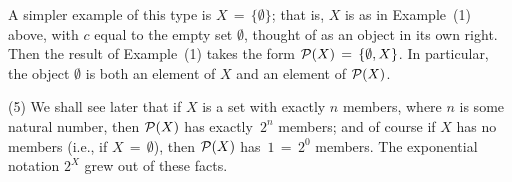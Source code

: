         A simpler example of this type is $X \,=\, \{{\emptyset}\}$;
    that is, $X$ is as in Example~(1) above, with $c$ equal to the empty set ${\emptyset}$, thought of as an object in its own right.
    Then the result of Example~(1) takes the form ${\cal P}(X) \,=\, \{{\emptyset},X\}$.
    In particular, the object ${\emptyset}$ is both an element of $X$ and an element of ${\cal P}(X)$.

\V

        (5) We shall see later that if $X$ is a set with exactly $n$ members, where $n$ is some natural number,
    then ${\cal P}(X)$ has exactly~$2^{n}$ members; and of course if $X$ has no members (i.e., if $X \,=\, {\emptyset}$),
    then ${\cal P}(X)$ has~$1 \,=\, 2^{0}$ members. The exponential notation $2^{X}$ grew out of these facts.

\V

